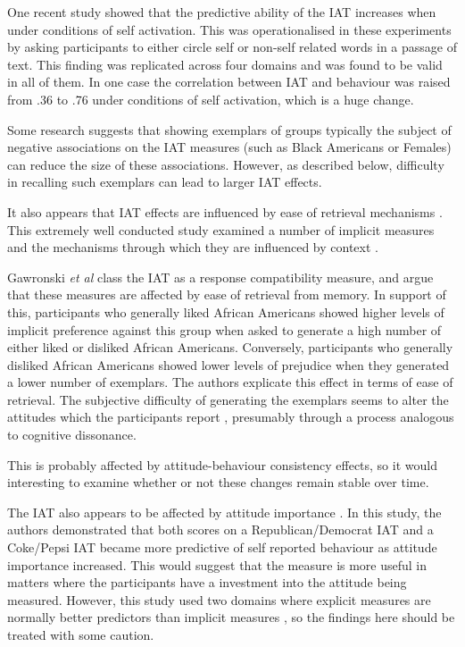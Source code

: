 One recent study \cite{Perugini2007} showed that the predictive ability of the IAT increases when under conditions of self activation. This was operationalised in these experiments by asking participants to either circle self or non-self related words in a passage of text. This finding was replicated across four domains and was found to be valid in all of them. In one case the correlation between IAT and behaviour was raised from .36 to .76 under conditions of self activation, which is a huge change. 

Some research \cite{Dasgupta2001} suggests that showing exemplars of groups typically the subject of negative associations on the IAT measures (such as Black Americans or Females) can reduce the size of these associations. However, as described below, difficulty in recalling such exemplars can lead to larger IAT effects. 

It also appears that IAT effects are influenced by ease of retrieval mechanisms \cite{Kahneman2002} . This extremely well conducted study examined a number of implicit measures and the mechanisms through which they are influenced by context \cite{Gawronski2005}. 

Gawronski \textit{et al} class the IAT as a response compatibility measure, and argue that these measures are affected by ease of retrieval from memory. In support of this, participants who generally liked African Americans showed higher levels of implicit preference against this group when asked to generate a high number of either liked or disliked African Americans. Conversely, participants who generally disliked African Americans showed lower levels of prejudice when they generated a lower number of exemplars. The authors explicate this effect in terms of ease of retrieval. The subjective difficulty of generating the exemplars seems to alter the attitudes which the participants report \cite{Kahneman2002}, presumably through a process analogous to cognitive dissonance.   


This is probably affected by attitude-behaviour consistency effects, so it would interesting to examine whether or not these changes remain stable over time.  

The IAT also appears to be affected by attitude importance \cite{Karpinski2005}. In this study, the authors demonstrated that both scores on a Republican/Democrat IAT and a Coke/Pepsi IAT became more predictive of self reported behaviour as attitude importance increased. This would suggest that the measure is more useful in matters where the participants have a investment into the attitude being measured. However, this study used two domains where explicit measures are normally better predictors than implicit measures \cite{Nosek2007d}, so the findings here should be treated with some caution. 

